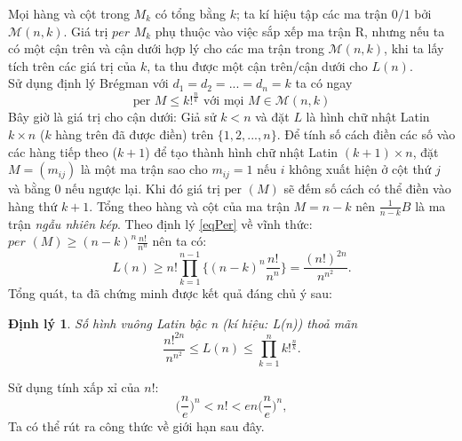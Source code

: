 \documentclass[a4paper, 12pt]{report}
\newtheorem*{theorem}{Định lý } %
\begin{document}
Mọi hàng và cột trong $M_k$ có tổng bằng $k$; ta kí hiệu tập các ma trận $0/1$ bởi $\mathcal{M}(n,k)$. Giá trị $per$ $M_k$ phụ thuộc vào việc sắp xếp ma trận R, nhưng nếu ta có một cận trên và cận dưới hợp lý cho các ma trận trong $\mathcal{M}(n,k)$, khi ta lấy tích trên các giá trị của $k$, ta thu được một cận trên/cận dưới cho $L(n)$.\\
Sử dụng định lý Brégman với $d_1=d_2=...=d_n=k$ ta có ngay
\begin{equation*}
	\textrm{per } M \leq k!^{\frac{n}{k}}		 \textrm{								với mọi      }M \in \mathcal{M}(n,k)
\end{equation*} 
Bây giờ là giá trị cho cận dưới: Giả sử $k<n$ và đặt $L$ là hình chữ nhật Latin $k \times n$ ($k$ hàng trên đã được điền) trên $\{1,2,...,n\}$. Để tính số cách điền các số vào các hàng tiếp theo ($k+1$) để tạo thành hình chữ nhật Latin $(k+1) \times n$, đặt $M=(m_{ij})$ là một ma trận sao cho $m_{ij} = 1$ nếu $i$ không xuất hiện ở cột thứ $j$ và bằng $0$ nếu ngược lại. Khi đó giá trị $\textrm{per }(M)$ sẽ đếm số cách có thể điền vào hàng thứ $k+1$. Tổng theo hàng và cột của ma trận $M = n-k$ nên $\frac{1}{n-k}B$ là ma trận \textit{ngẫu nhiên kép}. Theo định lý \eqref{eqPer} về vĩnh thức: $\textit{per }(M) \geq (n-k)^n\frac{n!}{n^n}$ nên ta có:
\begin{equation*}
	L(n) \geq n! \displaystyle\prod_{k=1}^{n-1}\{ (n-k)^{n}\frac{n!}{n^n} \} = \frac{(n!)^{2n}}{n^{n^2}} .
\end{equation*}
Tổng quát, ta đã chứng minh được kết quả đáng chủ ý sau:
\begin{theorem}
	Số hình vuông Latin bậc n (kí hiệu: L(n)) thoả mãn
	\begin{equation*}
		\frac{n!^{2n}}{n^{n^2}} \leq L(n) \leq \displaystyle \prod_{k=1}^{n} k!^{\frac{n}{k}}.
	\end{equation*}
\end{theorem}

Sử dụng tính xấp xỉ của $n!$:
\begin{equation}
	\Big( \frac{n}{e} \Big)^n < n! < en\Big(\frac{n}{e} \Big)^n, \label{n!}
\end{equation}
Ta có thể rút ra công thức về giới hạn sau đây.
\end{document}
